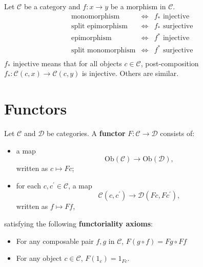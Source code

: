\documentclass[12pt, oneside]{book}
\begin{document}
\begin{proposition}
    Let $\mathcal{C}$ be a category and $f: x \rightarrow y$ be a morphism in $\mathcal{C}$.
    \begin{equation*}
        \begin{array}{ccc}
            \text{monomorphism}       & \Longleftrightarrow & f_* \text{ injective }  \\
            \text{split epimorphism}  & \Longleftrightarrow & f_* \text{ surjective } \\
            \text{epimorphism}        & \Longleftrightarrow & f^* \text{ injective }  \\
            \text{split monomorphism} & \Longleftrightarrow & f^* \text{ surjective } \\
        \end{array}
    \end{equation*}
    $f_*$ injective means that for all objects $c \in \mathcal{C}$, post-composition $f_*:\mathcal{C}(c,x) \rightarrow \mathcal{C}(c,y)$ is injective. Others are similar.
\end{proposition}




















\section{Functors} %
\begin{definition}
    Let $\mathcal{C}$ and $\mathcal{D}$ be categories. A \textbf{functor} $F: \mathcal{C} \rightarrow \mathcal{D}$ consists of:
    \begin{itemize}
        \item
              a map
              \begin{equation*}
                  \mathrm{Ob}(\mathcal{C}) \rightarrow \mathrm{Ob}(\mathcal{D}),
              \end{equation*}
              written as $c \mapsto Fc$;
        \item
              for each $c, c^{\prime} \in \mathcal{C}$, a map
              \begin{equation*}
                  \mathcal{C}\left(c, c^{\prime}\right) \rightarrow \mathcal{D}\left(Fc, Fc^{\prime}\right),
              \end{equation*}
              written as $f \mapsto Ff  $,
    \end{itemize}
    satisfying the following \textbf{functoriality axioms}:
    \begin{itemize}
        \item
              For any composable pair $f, g$ in $\mathcal{C}$, $F\left(g \circ f\right)=Fg \circ Ff$
        \item
              For any object $c\in \mathcal{C}$, $F\left(1_c\right)=1_{Fc}$.
    \end{itemize}
\end{definition}
\end{document}
